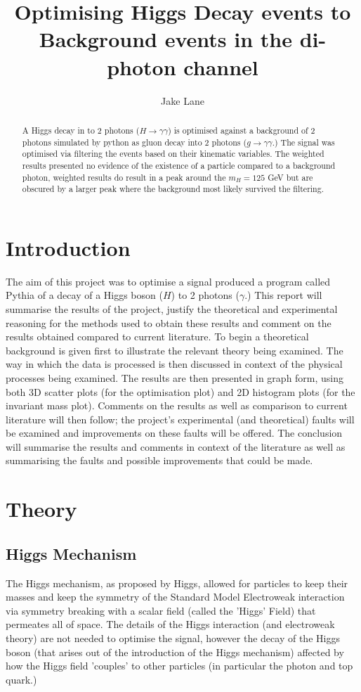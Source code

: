 \documentclass{article}
\author{Jake Lane}
\title{Optimising Higgs Decay events to Background events in the di-photon channel}
\begin{document}
\maketitle
\begin{abstract}
A Higgs decay in to 2 photons ($H \rightarrow \gamma \gamma$) is optimised against a background of 2 photons simulated by python as gluon decay into 2 photons ($g \rightarrow \gamma \gamma$.) The signal was optimised via filtering the events based on their kinematic variables. The weighted results presented no evidence of the existence of a particle compared to a background photon, weighted results do result in a peak around the $m_H = 125$ GeV but are obscured by a larger peak where the background most likely survived the filtering. 
\end{abstract}
\section{Introduction}
The aim of this project was to optimise a signal produced a program called Pythia of a decay of a Higgs boson ($H$) to 2 photons ($\gamma$.) This report will summarise the results of the project, justify the theoretical and experimental reasoning for the methods used to obtain these results and comment on the results obtained compared to current literature. \cite{HiggsDetection}
To begin a theoretical background is given first to illustrate the relevant theory being examined. The way in which the data is processed is then discussed in context of the physical processes being examined. The results are then presented in graph form, using both 3D scatter plots (for the optimisation plot) and 2D histogram plots (for the invariant mass plot). Comments on the results as well as comparison to current literature will then follow; the project's experimental (and theoretical) faults will be examined and improvements on these faults will be offered. The conclusion will summarise the results and comments in context of the literature as well as summarising the faults and possible improvements that could be made.  
\section{Theory}
\subsection{Higgs Mechanism}
The Higgs mechanism, as proposed by Higgs, allowed for particles to keep their masses and keep the symmetry of the Standard Model Electroweak interaction via symmetry breaking with a scalar field (called the 'Higgs' Field) that permeates all of space.\cite[p.~1159]{peterHiggs66} The details of the Higgs interaction (and electroweak theory) are not needed to optimise the signal, however the decay of the Higgs boson (that arises out of the introduction of the Higgs mechanism) affected by how the Higgs field 'couples' to other particles (in particular the photon and top quark.)
\end{document}
